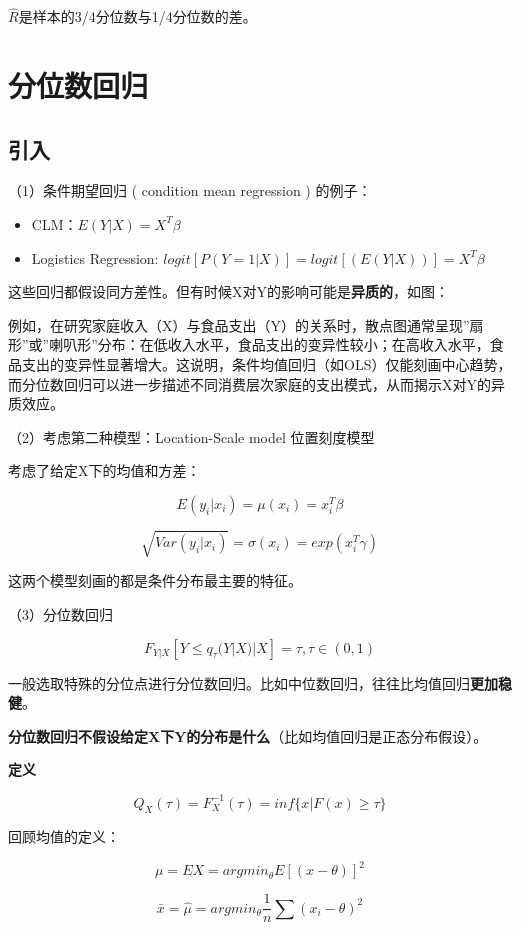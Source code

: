 \documentclass[
]{book}
\begin{document}
\(\hat{R}\)是样本的3/4分位数与1/4分位数的差。

\section{分位数回归}\label{ux5206ux4f4dux6570ux56deux5f52}

\subsection{引入}\label{ux5f15ux5165}

（1）条件期望回归 ( condition mean regression ) 的例子：

\begin{itemize}
\item
  CLM：\(E(Y|X)=X^T\beta\)
\item
  Logistics Regression: \(logit[P(Y=1|X)]=logit[(E(Y|X))]=X^T\beta\)
\end{itemize}

这些回归都假设同方差性。但有时候X对Y的影响可能是\textbf{异质的}，如图：

例如，在研究家庭收入（X）与食品支出（Y）的关系时，散点图通常呈现''扇形''或''喇叭形''分布：在低收入水平，食品支出的变异性较小；在高收入水平，食品支出的变异性显著增大。这说明，条件均值回归（如OLS）仅能刻画中心趋势，而分位数回归可以进一步描述不同消费层次家庭的支出模式，从而揭示X对Y的异质效应。

（2）考虑第二种模型：Location-Scale model 位置刻度模型

考虑了给定X下的均值和方差：

\[
E(y_i|x_i)=\mu(x_i)=x_i^T\beta
\]

\[
\sqrt{Var(y_i|x_i)}=\sigma(x_i)=exp(x_i^T\gamma)
\]

这两个模型刻画的都是条件分布最主要的特征。

（3）分位数回归

\[
F_{Y|X}[Y\leq q_{\tau}(Y|X)|X]=\tau,\tau\in(0,1)
\]

一般选取特殊的分位点进行分位数回归。比如中位数回归，往往比均值回归\textbf{更加稳健}。

\textbf{分位数回归不假设给定X下Y的分布是什么}（比如均值回归是正态分布假设）。

\textbf{定义}

\[
Q_X(\tau)=F_X^{-1}(\tau)=inf\{x|F(x)\geq \tau \}
\]

回顾均值的定义：

\[
\mu=EX=argmin_{\theta}E[(x-\theta)]^2
\]

\[
\bar{x}=\hat{\mu}=argmin_{\theta}\frac{1}{n}\sum(x_i-\theta)^2
\]
\end{document}

